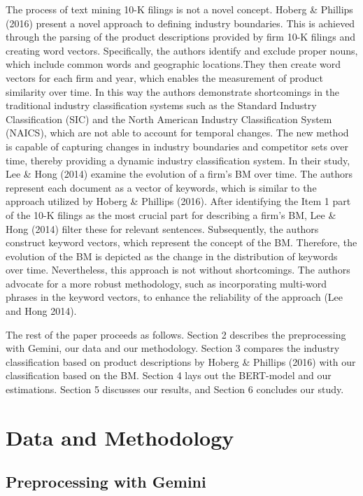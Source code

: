 \documentclass[
]{article}
\begin{document}
The process of text mining 10-K filings is not a novel concept. Hoberg
\& Phillips (2016) present a novel approach to defining industry
boundaries. This is achieved through the parsing of the product
descriptions provided by firm 10-K filings and creating word vectors.
Specifically, the authors identify and exclude proper nouns, which
include common words and geographic locations.They then create word
vectors for each firm and year, which enables the measurement of product
similarity over time. In this way the authors demonstrate shortcomings
in the traditional industry classification systems such as the Standard
Industry Classification (SIC) and the North American Industry
Classification System (NAICS), which are not able to account for
temporal changes. The new method is capable of capturing changes in
industry boundaries and competitor sets over time, thereby providing a
dynamic industry classification system. In their study, Lee \& Hong
(2014) examine the evolution of a firm's BM over time. The authors
represent each document as a vector of keywords, which is similar to the
approach utilized by Hoberg \& Phillips (2016). After identifying the
Item 1 part of the 10-K filings as the most crucial part for describing
a firm's BM, Lee \& Hong (2014) filter these for relevant sentences.
Subsequently, the authors construct keyword vectors, which represent the
concept of the BM. Therefore, the evolution of the BM is depicted as the
change in the distribution of keywords over time. Nevertheless, this
approach is not without shortcomings. The authors advocate for a more
robust methodology, such as incorporating multi-word phrases in the
keyword vectors, to enhance the reliability of the approach (Lee and
Hong 2014).

The rest of the paper proceeds as follows. Section 2 describes the
preprocessing with Gemini, our data and our methodology. Section 3
compares the industry classification based on product descriptions by
Hoberg \& Phillips (2016) with our classification based on the BM.
Section 4 lays out the BERT-model and our estimations. Section 5
discusses our results, and Section 6 concludes our study.

\section{Data and Methodology}\label{data-and-methodology}

\subsection{Preprocessing with Gemini}\label{preprocessing-with-gemini}
\end{document}
